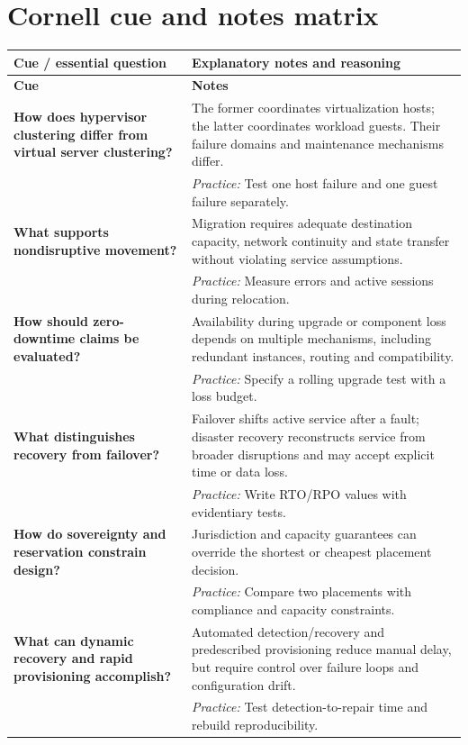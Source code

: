 \documentclass[10pt,letterpaper]{article}
\begin{document}
\section{Cornell cue and notes matrix}
\small\setlength{\LTleft}{0pt}\setlength{\LTright}{0pt plus 1fill}
\begin{longtable}{>{\RaggedRight\arraybackslash}p{}>{\RaggedRight\arraybackslash}p{}}
\toprule\textbf{Cue / essential question}&\textbf{Explanatory notes and reasoning}\\\midrule\endfirsthead\toprule\textbf{Cue}&\textbf{Notes}\\\midrule\endhead
\textbf{How does hypervisor clustering differ from virtual server clustering?} & The former coordinates virtualization hosts; the latter coordinates workload guests. Their failure domains and maintenance mechanisms differ.\\[3pt]& \textcolor{petrol}{\emph{Practice:} Test one host failure and one guest failure separately.}\\[8pt]\midrule
\textbf{What supports nondisruptive movement?} & Migration requires adequate destination capacity, network continuity and state transfer without violating service assumptions.\\[3pt]& \textcolor{petrol}{\emph{Practice:} Measure errors and active sessions during relocation.}\\[8pt]\midrule
\textbf{How should zero-downtime claims be evaluated?} & Availability during upgrade or component loss depends on multiple mechanisms, including redundant instances, routing and compatibility.\\[3pt]& \textcolor{petrol}{\emph{Practice:} Specify a rolling upgrade test with a loss budget.}\\[8pt]\midrule
\textbf{What distinguishes recovery from failover?} & Failover shifts active service after a fault; disaster recovery reconstructs service from broader disruptions and may accept explicit time or data loss.\\[3pt]& \textcolor{petrol}{\emph{Practice:} Write RTO/RPO values with evidentiary tests.}\\[8pt]\midrule
\textbf{How do sovereignty and reservation constrain design?} & Jurisdiction and capacity guarantees can override the shortest or cheapest placement decision.\\[3pt]& \textcolor{petrol}{\emph{Practice:} Compare two placements with compliance and capacity constraints.}\\[8pt]\midrule
\textbf{What can dynamic recovery and rapid provisioning accomplish?} & Automated detection/recovery and predescribed provisioning reduce manual delay, but require control over failure loops and configuration drift.\\[3pt]& \textcolor{petrol}{\emph{Practice:} Test detection-to-repair time and rebuild reproducibility.}\\[8pt]\midrule

\end{longtable}
\end{document}
